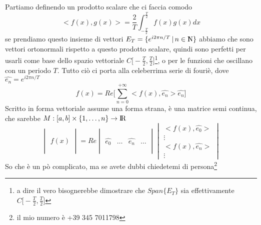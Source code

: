 \documentclass[11pt,a4paper]{article}
\theoremstyle{definition}
\theoremstyle{plain}
\theoremstyle{plain}
\begin{document}
		Partiamo definendo un prodotto scalare che ci faccia comodo
		\begin{equation}
			<f(x),g(x)>=\frac{2}{T}\int_{-\frac{T}{2}}^\frac{T}{2} f(x)g(x)dx
		\end{equation}
		se prendiamo questo insieme di vettori $E_T=\{e^{i2\pi n/ T} \, | \, n \in \rm I\!\! N\}$ abbiamo che sono vettori ortonormali rispetto a questo prodotto scalare, quindi sono perfetti per usarli come base dello spazio vettoriale $C\big[-\frac{T}{2},\frac{T}{2}\big]$\footnote{a dire il vero bisognerebbe dimostrare che $Span\{E_T\}$ sia effettivamente $C\big[-\frac{T}{2},\frac{T}{2}\big]$}, o per le funzioni che oscillano con un periodo $T$.\newline
		Tutto ciò ci porta alla celeberrima serie di fouriè, dove $\widehat{e_n}=e^{i2\pi n/ T}$
		\begin{equation}
		\label{serieFuriè}
			f(x)=Re\Bigg[\sum_{n=0}^{+\infty} <f(x),\widehat{e_n}>\widehat{e_n}\Bigg]
		\end{equation}
		Scritto in forma vettoriale assume una forma strana, è una matrice semi continua, che sarebbe $M:[a,b]\times \{1,\dots,n\}\rightarrow \rm I\!R$
		\begin{equation}
			\begin{vmatrix}
				\,\\
				\,\\
				f(x)\\
				\,\\
				\,
			\end{vmatrix}
			=Re
			\begin{vmatrix}
				\, & & &\\
				\, & & &\\
				\widehat{e_0}& \dots & \widehat{e_n}&\dots\\
				\, & & &\\
				\, & & &
			\end{vmatrix}
			\begin{vmatrix}
				<f(x),\widehat{e_0}>\\
				\vdots\\
				<f(x),\widehat{e_n}>\\
				\vdots
			\end{vmatrix}
		\end{equation}
		So che è un pò complicato, ma se avete dubbi chiedetemi di persona\footnote{il mio numero è +39 345 7011798}
\end{document}
